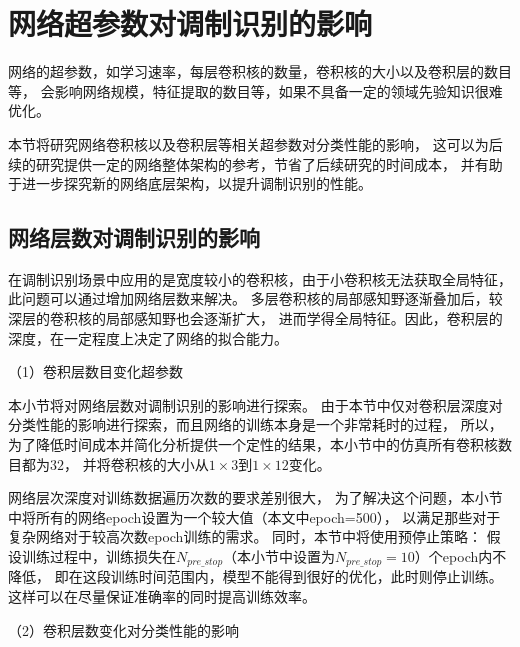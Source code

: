 \section{网络超参数对调制识别的影响}
网络的超参数，如学习速率，每层卷积核的数量，卷积核的大小以及卷积层的数目等，
会影响网络规模，特征提取的数目等，如果不具备一定的领域先验知识很难优化。\par

本节将研究网络卷积核以及卷积层等相关超参数对分类性能的影响，
这可以为后续的研究提供一定的网络整体架构的参考，节省了后续研究的时间成本，
并有助于进一步探究新的网络底层架构，以提升调制识别的性能。\par

\subsection{网络层数对调制识别的影响}
在调制识别场景中应用的是宽度较小的卷积核，由于小卷积核无法获取全局特征，
此问题可以通过增加网络层数来解决。
多层卷积核的局部感知野逐渐叠加后，较深层的卷积核的局部感知野也会逐渐扩大，
进而学得全局特征。因此，卷积层的深度，在一定程度上决定了网络的拟合能力。\par

（1）卷积层数目变化超参数\par

本小节将对网络层数对调制识别的影响进行探索。
由于本节中仅对卷积层深度对分类性能的影响进行探索，而且网络的训练本身是一个非常耗时的过程，
所以，为了降低时间成本并简化分析提供一个定性的结果，本小节中的仿真所有卷积核数目都为$32$，
并将卷积核的大小从$1\times3$到$1\times12$变化。\par
网络层次深度对训练数据遍历次数的要求差别很大，
为了解决这个问题，本小节中将所有的网络epoch设置为一个较大值（本文中epoch=500），
以满足那些对于复杂网络对于较高次数epoch训练的需求。
同时，本节中将使用预停止策略：
假设训练过程中，训练损失在$N_{pre\_stop}$（本小节中设置为$N_{pre\_stop}=10$）个epoch内不降低，
即在这段训练时间范围内，模型不能得到很好的优化，此时则停止训练。
这样可以在尽量保证准确率的同时提高训练效率。\par

（2）卷积层数变化对分类性能的影响\par

